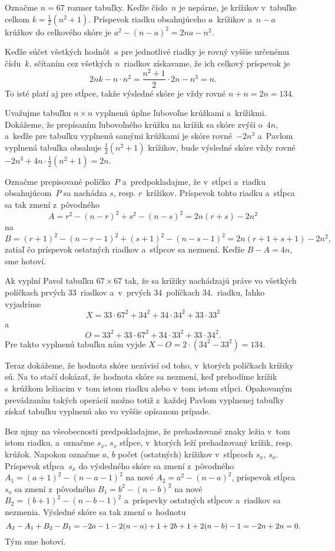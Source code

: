 {%
Označme $n=67$ rozmer tabuľky. Keďže číslo~$n$ je
nepárne, je krížikov v~tabuľke celkom $k=\frac12(n^2+1)$. Príspevok riadku
obsahujúceho $a$~krížikov a~$n-a$ krúžkov do celkového skóre je
$a^2-(n-a)^2= 2na - n^2$.

Keďže súčet všetkých hodnôt~$a$ pre jednotlivé riadky je rovný vyššie
určenému číslu~$k$, sčítaním cez všetkých $n$~riadkov získavame,
že ich celkový príspevok je
$$
2nk-n\cdot n^2= \frac{n^2+1}2\cdot 2n -n^3=n.
$$
To isté platí aj pre stĺpce, takže výsledné skóre je vždy rovné
$n+n=2n=134$.

\ineres
Uvažujme tabuľku $n\times n$
vyplnenú úplne ľubovoľne krúžkami a~krížikmi. Dokážeme, že prepísaním
ľubovoľného krúžku na krížik sa skóre zvýši o~$4n$, a~keďže pre
tabuľku vyplnenú samými krúžkami je skóre rovné~${-2}n^3$ a~Pavlom
vyplnená tabuľka obsahuje $\frac12(n^2+1)$ krížikov, bude výsledné skóre vždy
rovné ${-2}n^3+4n\cdot \frac12(n^2+1)=2n$.

Označme prepisované políčko~$P$ a~predpokladajme, že v~stĺpci a~riadku
obsahujúcom~$P$ sa nachádza $s$, resp. $r$~krížikov. Príspevok tohto
riadku a~stĺpca sa tak zmení z~pôvodného
$$
A=r^2-(n-r)^2+s^2-(n-s)^2=2n(r+s)-2n^2
$$
na
$$
B=(r+1)^2-(n-r-1)^2+(s+1)^2-(n-s-1)^2=2n(r+1+s+1)-2n^2,
$$
zatiaľ čo príspevok ostatných riadkov a~stĺpcov sa nezmení. Keďže $B-A=4n$,
sme hotoví.

\ineres
Ak vyplní Pavol tabuľku $67\times 67$ tak, že sa krížiky
nachádzajú práve vo všetkých políčkach prvých 33~riadkov
a~v~prvých 34~políčkach 34.~riadku, ľahko vyjadríme
$$
X= 33\cdot 67^2+34^2 +34\cdot 34^2+33\cdot 33^2
$$
a
$$
O= 33^2+33\cdot 67^2+ 34\cdot 33^2+33\cdot 34^2.
$$
Pre takto vyplnenú tabuľku nám vyjde $X-O= 2\cdot (34^2-33^2)=134$.

Teraz dokážeme, že hodnota skóre nezávisí od toho, v~ktorých
políčkach krížiky sú. Na to stačí dokázať, že hodnota
skóre sa nezmení, keď prehodíme krížik s~krúžkom ležiacim v~tom istom
riadku alebo v~tom istom stĺpci. Opakovaným prevádzaním takých operácií možno
totiž z~každej Pavlom vyplnenej tabuľky získať
tabuľku vyplnenú ako vo vyššie opísanom prípade.

Bez ujmy na všeobecnosti predpokladajme, že prehadzované znaky ležia v~tom istom
riadku, a~označme $s_x$, $s_o$ stĺpce, v~ktorých leží prehadzovaný krížik, resp.
krúžok. Napokon označme $a$, $b$ počet (ostatných) krížikov
v~stĺpcoch $s_x$, $s_o$. Príspevok stĺpca~$s_x$ do výsledného skóre
sa zmení z~pôvodného $A_1=(a+1)^2-(n-a-1)^2$ na nové $A_2=a^2-(n-a)^2$,
príspevok stĺpca~$s_o$ sa zmení z~pôvodného $B_1=b^2-(n-b)^2$ na nové
$B_2=(b+1)^2-(n-b-1)^2$ a~príspevky ostatných stĺpcov a~riadkov sa
nezmenia. Výsledné skóre sa tak zmení o~hodnotu
$$
\postdisplaypenalty10000
A_2 - A_1+B_2-B_1 =-2a-1-2(n-a)+1 + 2b+1 +2(n-b)-1=-2n+2n=0.
$$
Tým sme hotoví.

}
